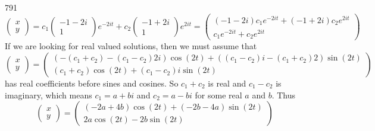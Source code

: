 \documentclass[12pt,a4paper]{article}
\begin{document}
\begin{problem}{791}
        \[
            \begin{pmatrix}
                x\\y
            \end{pmatrix}
            =
            c_1
            \begin{pmatrix}
                -1-2i\\1
            \end{pmatrix}
            e^{-2it}
            +
            c_2
            \begin{pmatrix}
                -1+2i\\1
            \end{pmatrix}
            e^{2it}
            =
            \begin{pmatrix}
                (-1-2i) c_1 e^{-2it} + (-1+2i) c_2 e^{2it}\\
                c_1 e^{-2it} + c_2 e^{2it}
            \end{pmatrix}
        \]
        If we are looking for real valued solutions, then we must assume that
        \[
            \begin{pmatrix}
                x\\y
            \end{pmatrix}
            =
            \begin{pmatrix}
                (-(c_1 + c_2) - (c_1 - c_2)2i) \cos(2t) + ((c_1 - c_2)i - (c_1 + c_2)2)\sin(2t)\\
                (c_1 + c_2) \cos(2t) + (c_1 - c_2)i \sin(2t)
            \end{pmatrix}
        \]
        has real coefficients before sines and cosines. So $c_1 + c_2$ is real and $c_1 - c_2$ is imaginary, which means $c_1 = a + bi$ and $c_2 = a - bi$ for some real $a$ and $b$. Thus
        \[
            \begin{pmatrix}
                x\\y
            \end{pmatrix}
            =
            \begin{pmatrix}
                (-2a + 4b) \cos(2t) + (-2b - 4a)\sin(2t)\\
                2a \cos(2t) - 2b \sin(2t)
            \end{pmatrix}
        \]
    \end{problem}
\end{document}
